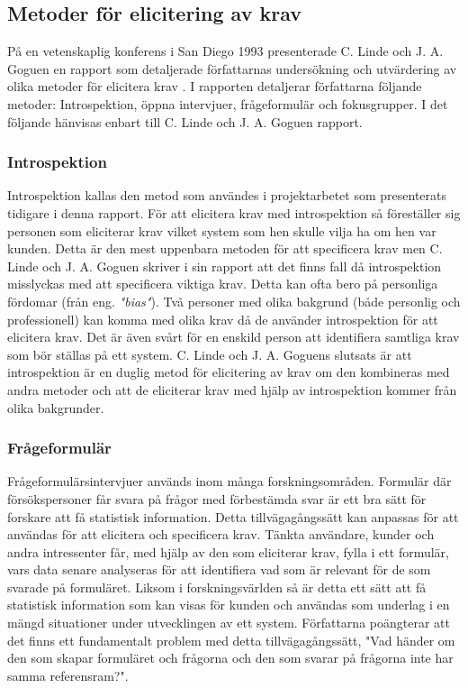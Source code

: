 \subsection{Metoder för elicitering av krav}
På en vetenskaplig konferens i San Diego 1993 presenterade C. Linde och J. A. Goguen en rapport som detaljerade författarnas undersökning och utvärdering av olika metoder för elicitera krav \cite{goguen1993techniques}. I rapporten detaljerar författarna följande metoder: Introspektion, öppna intervjuer, frågeformulär och fokusgrupper. I det följande hänvisas enbart till C. Linde och J. A. Goguen rapport. \cite{goguen1993techniques}

\subsubsection{Introspektion}
Introspektion kallas den metod som användes i projektarbetet som presenterats tidigare i denna rapport. För att elicitera krav med introspektion så föreställer sig personen som eliciterar krav vilket system som hen skulle vilja ha om hen var kunden. Detta är den mest uppenbara metoden för att specificera krav men  C. Linde och J. A. Goguen skriver i sin rapport att det finns fall då introspektion misslyckas med att specificera viktiga krav. Detta kan ofta bero på personliga fördomar (från eng. \textit{"bias"}). Två personer med olika bakgrund (både personlig och professionell) kan komma med olika krav då de använder introspektion för att elicitera krav. Det är även svårt för en enskild person att identifiera samtliga krav som bör ställas på ett system.  C. Linde och J. A. Goguens slutsats är att introspektion är en duglig metod för elicitering av krav om den kombineras med andra metoder och att de eliciterar krav med hjälp av introspektion kommer från olika bakgrunder. 

\subsubsection{Frågeformulär}
Frågeformulärsintervjuer används inom många forskningsområden. Formulär där försökspersoner får svara på frågor med förbestämda svar är ett bra sätt för forskare att få statistisk information. Detta tillvägagångssätt kan anpassas för att användas för att elicitera och specificera krav. Tänkta användare, kunder och andra intressenter får, med hjälp av den som eliciterar krav, fylla i ett formulär, vars data senare analyseras för att identifiera vad som är relevant för de som svarade på formuläret. Liksom i forskningsvärlden så är detta ett sätt att få statistisk information som kan visas för kunden och användas som underlag i en mängd situationer under utvecklingen av ett system. Författarna poängterar att det finns ett fundamentalt problem med detta tillvägagångssätt, "Vad händer om den som skapar formuläret och frågorna och den som svarar på frågorna inte har samma referensram?".
 
